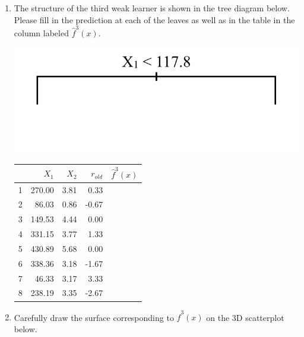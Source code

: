 \documentclass{article}\usepackage[]{graphicx}\usepackage[]{color}
\begin{document}
\begin{enumerate}
\item The structure of the third weak learner is shown in the tree diagram below. Please fill in the prediction at each of the leaves as well as in the table in the column labeled $\hat{f}^3(x)$.

\vspace{10mm}

\begin{minipage}[t]{.4\textwidth}
{\includegraphics[width=\textwidth]{treeC.png}}
\end{minipage}
\hfill
\begin{minipage}[t]{.4\textwidth}
\begin{tabular}{rrrrl}
  \hline
 & $X_1$ & $X_2$ & $r_{old}$ & $\hat{f}^3(x)$ \\ 
  \hline
1 & 270.00 & 3.81 & 0.33 &  \\ 
  2 & 86.03 & 0.86 & -0.67 &  \\ 
  3 & 149.53 & 4.44 & 0.00 &  \\ 
  4 & 331.15 & 3.77 & 1.33 &  \\ 
  5 & 430.89 & 5.68 & 0.00 &  \\ 
  6 & 338.36 & 3.18 & -1.67 &  \\ 
  7 & 46.33 & 3.17 & 3.33 &  \\ 
  8 & 238.19 & 3.35 & -2.67 &  \\ 
   \hline
\end{tabular}

\end{minipage}

\vspace{8mm}
\item Carefully draw the surface corresponding to $\hat{f}^3(x)$ on the 3D scatterplot below.

\vspace{-8mm}


\end{enumerate}
\end{document}
